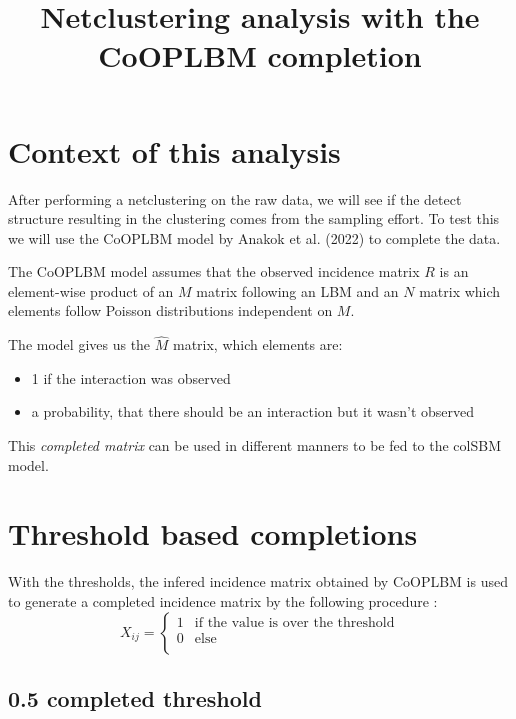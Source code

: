 \documentclass[
]{article}
\title{Netclustering analysis with the CoOPLBM completion}
\author{}
\date{\vspace{-2.5em}}
\providecommand{\tightlist}{%
  \setlength{\itemsep}{0pt}\setlength{\parskip}{0pt}}
\begin{document}
\maketitle

\hypertarget{context-of-this-analysis}{%
\section{Context of this analysis}\label{context-of-this-analysis}}

After performing a netclustering on the raw data, we will see if the
detect structure resulting in the clustering comes from the sampling
effort. To test this we will use the CoOPLBM model by Anakok et al.
(2022) to complete the data.

The CoOPLBM model assumes that the observed incidence matrix \(R\) is an
element-wise product of an \(M\) matrix following an LBM and an \(N\)
matrix which elements follow Poisson distributions independent on \(M\).

The model gives us the \(\hat{M}\) matrix, which elements are:

\begin{itemize}
\tightlist
\item
  1 if the interaction was observed
\item
  a probability, that there should be an interaction but it wasn't
  observed
\end{itemize}

This \emph{completed matrix} can be used in different manners to be fed
to the colSBM model.

\hypertarget{threshold-based-completions}{%
\section{Threshold based
completions}\label{threshold-based-completions}}

With the thresholds, the infered incidence matrix obtained by CoOPLBM is
used to generate a completed incidence matrix by the following procedure
: \[X_{ij} = \begin{cases}
  1 & \text{if the value is over the threshold} \\
  0 & \text{else} \\
\end{cases}\]

\hypertarget{completed-threshold}{%
\subsection{0.5 completed threshold}\label{completed-threshold}}
\end{document}
